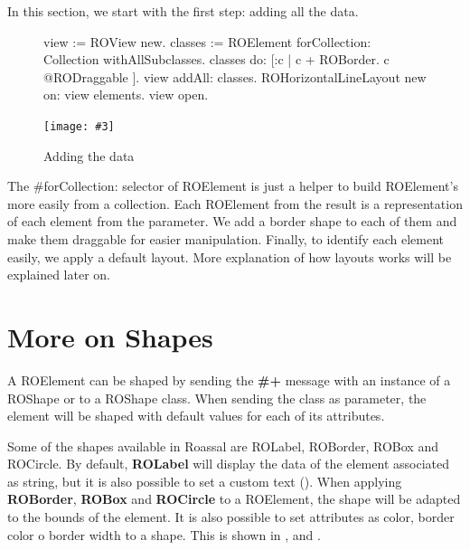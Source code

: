 \documentclass[a4paper,10pt,twoside]{book}
\newcommand{\fig}[4]{
		\begin{figure}[#1]
			\centering
			\texttt{[image: \#3]}
			\caption{\label{fig:#3}#4}
		\end{figure}}
\begin{document}
In this section, we start with the first step: adding all the data.
\begin{figure}[H]
\begin{code}{}
view := ROView new.
classes := ROElement forCollection: Collection withAllSubclasses.
classes 
	do: [:c | c + ROBorder.
			c @RODraggable ].
view addAll: classes.
ROHorizontalLineLayout new on: view elements.
view open.
\end{code}
\end{figure}

\fig{H}{0.6}{hier1}{Adding the data}

The \#forCollection: selector of ROElement is just a helper to build ROElement's more easily from a collection. Each ROElement from the result is a representation of each element from the parameter. We add a border shape to each of them and make them draggable for easier manipulation.
Finally, to identify each element easily, we apply a default layout. More explanation of how layouts works will be explained later on. 

%


\section{More on Shapes} 

A ROElement can be shaped by sending the \textbf{\#+} message with an instance of a ROShape or to a ROShape class. When sending the class as parameter, the element will be shaped with default values for each of its attributes.

Some of the shapes available in Roassal are ROLabel, ROBorder, ROBox and ROCircle. By default, \textbf{ROLabel} will display the data of the element associated as string, but it is also possible to set a custom text (). When applying \textbf{ROBorder}, \textbf{ROBox} and \textbf{ROCircle} to a ROElement, the shape will be adapted to the bounds of the element. It is also possible to set attributes as color, border color o border width to a shape. This is shown in ,  and .
\end{document}

